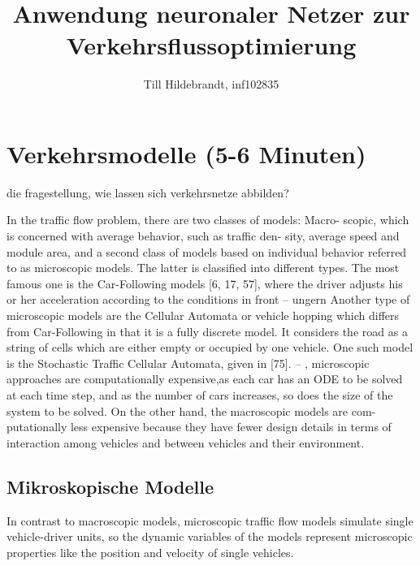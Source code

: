 \documentclass[journal=jacsat,manuscript=article]{achemso}
\author{Till Hildebrandt, inf102835}
\affiliation{University of Applied Sciences, Wedel}
\title[An \textsf{achemso} demo]
  {Anwendung neuronaler Netzer zur Verkehrsflussoptimierung}
\begin{document}
\newpage

\tableofcontents

\newpage



\newpage


\newpage



\section*{Verkehrsmodelle (5-6 Minuten)}
die fragestellung, wie lassen sich verkehrsnetze abbilden?

In the traffic flow problem, there are two classes of models: Macro- scopic, which is concerned with average behavior, such as traffic den- sity, average speed and module area, and a second class of models based on individual behavior referred to as microscopic models. The latter is classified into different types. The most famous one is the Car-Following models [6, 17, 57], where the driver adjusts his or her acceleration according to the conditions in front
-- ungern
Another type of microscopic models are the Cellular Automata or vehicle hopping which differs from Car-Following in that it is a fully discrete model. It considers the road as a string of cells which are either empty or occupied by one vehicle. One such model is the Stochastic Traffic Cellular Automata, given in [75].
--
, microscopic approaches are computationally expensive,as each car has an ODE to be solved at each time step, and as the number of cars increases, so does the size of the system to be solved.
On the other hand, the macroscopic models are com- putationally less expensive because they have fewer design details in terms of interaction among vehicles and between vehicles and their environment.

\subsection*{Mikroskopische Modelle}
In contrast to macroscopic models, microscopic traffic flow models simulate single vehicle-driver units, so the dynamic variables of the models represent microscopic properties like the position and velocity of single vehicles.
\end{document}
